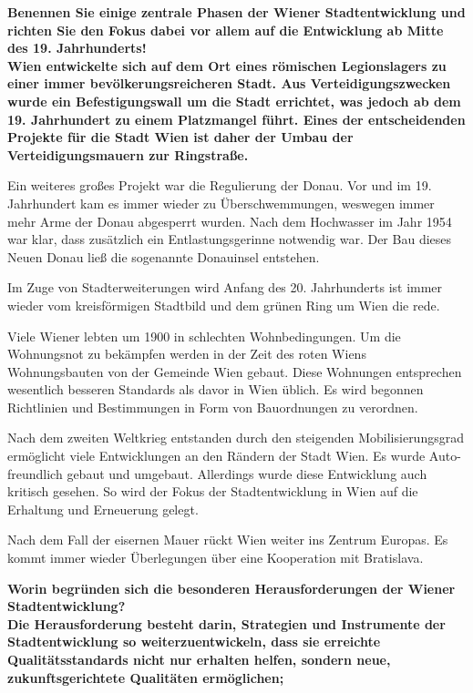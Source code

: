 \documentclass[]{article}
\newenvironment{question}{\vspace{8mm}\noindent\bfseries}{\\}
\begin{document}
\begin{question}
	Benennen Sie einige zentrale Phasen der Wiener Stadtentwicklung und richten Sie den Fokus dabei vor allem auf die Entwicklung ab Mitte des 19. Jahrhunderts!
\end{question}
Wien entwickelte sich auf dem Ort eines römischen Legionslagers zu einer immer bevölkerungsreicheren Stadt. Aus Verteidigungszwecken wurde ein Befestigungswall um die Stadt errichtet, was jedoch ab dem 19. Jahrhundert zu einem Platzmangel führt. Eines der entscheidenden Projekte für die Stadt Wien ist daher der Umbau der Verteidigungsmauern zur Ringstraße.

Ein weiteres großes Projekt war die Regulierung der Donau. Vor und im 19. Jahrhundert kam es immer wieder zu Überschwemmungen, weswegen immer mehr Arme der Donau abgesperrt wurden. Nach dem Hochwasser im Jahr 1954 war klar, dass zusätzlich ein Entlastungsgerinne notwendig war. Der Bau dieses Neuen Donau ließ die sogenannte Donauinsel entstehen.

Im Zuge von Stadterweiterungen wird Anfang des 20. Jahrhunderts ist immer wieder vom kreisförmigen Stadtbild und dem grünen Ring um Wien die rede.

Viele Wiener lebten um 1900 in schlechten Wohnbedingungen. Um die Wohnungsnot zu bekämpfen werden in der Zeit des roten Wiens Wohnungsbauten von der Gemeinde Wien gebaut. Diese Wohnungen entsprechen wesentlich besseren Standards als davor in Wien üblich. Es wird begonnen Richtlinien und Bestimmungen in Form von Bauordnungen zu verordnen.

Nach dem zweiten Weltkrieg entstanden durch den steigenden Mobilisierungsgrad ermöglicht viele Entwicklungen an den Rändern der Stadt Wien. Es wurde Auto-freundlich gebaut und umgebaut. Allerdings wurde diese Entwicklung auch kritisch gesehen. So wird der Fokus der Stadtentwicklung in Wien auf die Erhaltung und Erneuerung gelegt.

Nach dem Fall der eisernen Mauer rückt Wien weiter ins Zentrum Europas. Es kommt immer wieder Überlegungen über eine Kooperation mit Bratislava.

\begin{question}
	Worin begründen sich die besonderen Herausforderungen der Wiener Stadtentwicklung?
\end{question}
Die Herausforderung besteht darin, Strategien und Instrumente der Stadtentwicklung so weiterzuentwickeln, dass sie erreichte Qualitätsstandards nicht nur erhalten helfen, sondern neue, zukunftsgerichtete Qualitäten ermöglichen;
\end{document}

